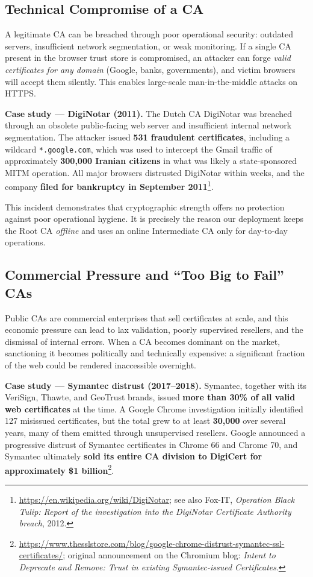 \documentclass[10pt,twocolumn]{article}
\begin{document}
\subsection{Technical Compromise of a CA}

A legitimate CA can be breached through poor operational security: outdated
servers, insufficient network segmentation, or weak monitoring. If a single
CA present in the browser trust store is compromised, an attacker can forge
\emph{valid certificates for any domain} (Google, banks, governments), and
victim browsers will accept them silently. This enables large-scale
man-in-the-middle attacks on HTTPS.

\textbf{Case study --- DigiNotar (2011).} The Dutch CA DigiNotar was
breached through an obsolete public-facing web server and insufficient
internal network segmentation. The attacker issued \textbf{531 fraudulent
certificates}, including a wildcard \texttt{*.google.com}, which was used
to intercept the Gmail traffic of approximately \textbf{300{,}000 Iranian
citizens} in what was likely a state-sponsored MITM operation. All major
browsers distrusted DigiNotar within weeks, and the company \textbf{filed
for bankruptcy in September 2011}\footnote{\url{https://en.wikipedia.org/wiki/DigiNotar}; see also Fox-IT, \textit{Operation Black Tulip: Report of the investigation into the DigiNotar Certificate Authority breach}, 2012.}.

This incident demonstrates that cryptographic strength offers no protection
against poor operational hygiene. It is precisely the reason our deployment
keeps the Root CA \emph{offline} and uses an online Intermediate CA only
for day-to-day operations.

\subsection{Commercial Pressure and ``Too Big to Fail'' CAs}

Public CAs are commercial enterprises that sell certificates at scale, and
this economic pressure can lead to lax validation, poorly supervised
resellers, and the dismissal of internal errors. When a CA becomes dominant
on the market, sanctioning it becomes politically and technically expensive:
a significant fraction of the web could be rendered inaccessible overnight.

\textbf{Case study --- Symantec distrust (2017--2018).} Symantec, together
with its VeriSign, Thawte, and GeoTrust brands, issued \textbf{more than
30\% of all valid web certificates} at the time. A Google Chrome
investigation initially identified 127 misissued certificates, but the
total grew to at least \textbf{30{,}000} over several years, many of them
emitted through unsupervised resellers. Google announced a progressive
distrust of Symantec certificates in Chrome 66 and Chrome 70, and Symantec
ultimately \textbf{sold its entire CA division to DigiCert for approximately
\$1 billion}\footnote{\url{https://www.thesslstore.com/blog/google-chrome-distrust-symantec-ssl-certificates/}; original announcement on the Chromium blog: \textit{Intent to Deprecate and Remove: Trust in existing Symantec-issued Certificates}.}.
\end{document}
